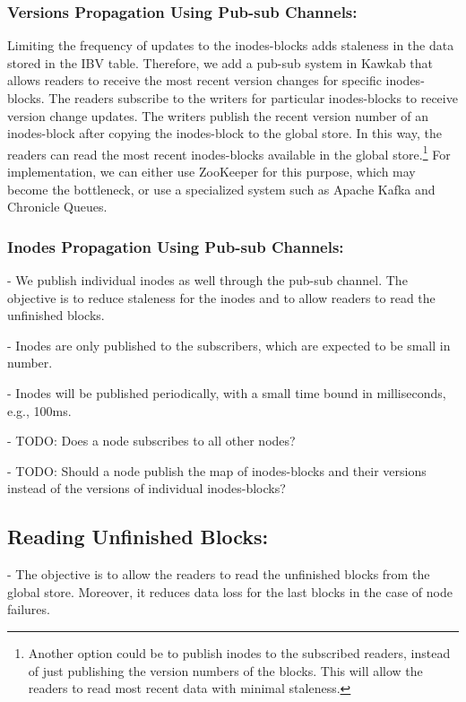 \documentclass[]{article}
\begin{document}
\subsubsection{Versions Propagation Using Pub-sub Channels:}

Limiting the frequency of updates to the inodes-blocks adds staleness in the
data stored in the IBV table. Therefore, we add a pub-sub system in Kawkab that
allows readers to receive the most recent version changes for specific
inodes-blocks. The readers subscribe to the writers for particular
inodes-blocks to receive version change updates. The writers publish the recent
version number of an inodes-block after copying the inodes-block to the
global store. In this way, the readers can read
the most recent inodes-blocks available in the global store.\footnote{Another
option could be to publish inodes to the subscribed readers, instead of just
publishing the version numbers of the blocks. This will allow the readers to
read most recent data with minimal staleness.} For implementation, we can
either use ZooKeeper for this purpose, which may become the bottleneck, or use
a specialized system such as Apache Kafka and Chronicle Queues.



\subsubsection{Inodes Propagation Using Pub-sub Channels:}


- We publish individual inodes as well through the pub-sub channel. The objective
  is to reduce staleness for the inodes and to allow readers to read the unfinished blocks.


- Inodes are only published to the subscribers, which are expected to be small
  in number.

- Inodes will be published periodically, with a small time bound in milliseconds, e.g.,
  100ms.



- TODO: Does a node subscribes to all other nodes?

- TODO: Should a node publish the map of inodes-blocks and their versions
  instead of the versions of individual inodes-blocks?

\subsection{Reading Unfinished Blocks:}

- The objective is to allow the readers to read the unfinished blocks
  from the global store. Moreover, it reduces data loss for the last blocks
  in the case of node failures.
\end{document}
